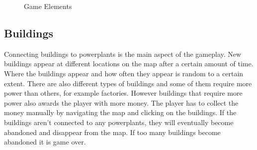     \begin{figure}[!ht]
    \centering
    \caption{Game Elements}
    \end{figure}


\subsection*{Buildings}
    Connecting buildings to powerplants is the main aspect of the gameplay. New buildings appear at 
    different locations on the map after a certain amount of time. Where the buildings appear and how 
    often they appear is random to a certain extent. There are also different types of buildings and 
    some of them require more power than others, for example factories. However buildings that require 
    more power also awards the player with more money. The player has to collect the money manually 
    by navigating the map and clicking on the buildings. If the buildings aren't connected to any 
    powerplants, they will eventually become abandoned and disappear from the map. If too many buildings 
    become abandoned it is game over.

